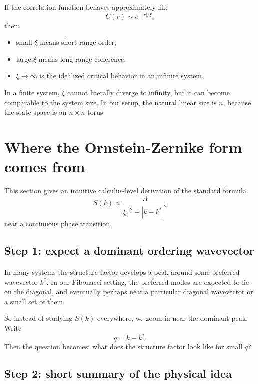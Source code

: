 \documentclass[11pt]{article}
\begin{document}
If the correlation function behaves approximately like
\begin{equation}
    C(r) \sim e^{-|r|/\xi},
\end{equation}
then:
\begin{itemize}
    \item small $\xi$ means short-range order,
    \item large $\xi$ means long-range coherence,
    \item $\xi \to \infty$ is the idealized critical behavior in an infinite system.
\end{itemize}

In a finite system, $\xi$ cannot literally diverge to infinity, but it can become comparable to the system size. In our setup, the natural linear size is $n$, because the state space is an $n \times n$ torus.

\section{Where the Ornstein-Zernike form comes from}

This section gives an intuitive calculus-level derivation of the standard formula
\begin{equation}
    S(k) \approx \frac{A}{\xi^{-2} + |k-k^*|^2}
\end{equation}
near a continuous phase transition.

\subsection{Step 1: expect a dominant ordering wavevector}

In many systems the structure factor develops a peak around some preferred wavevector $k^*$. In our Fibonacci setting, the preferred modes are expected to lie on the diagonal, and eventually perhaps near a particular diagonal wavevector or a small set of them.

So instead of studying $S(k)$ everywhere, we zoom in near the dominant peak. Write
\begin{equation}
    q = k-k^*.
\end{equation}
Then the question becomes: what does the structure factor look like for small $q$?

\subsection{Step 2: short summary of the physical idea}
\end{document}
